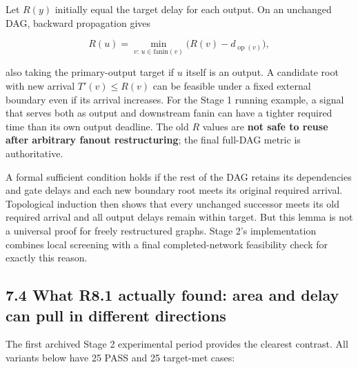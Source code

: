 Let \(R(y)\) initially equal the target delay for each output. On an unchanged DAG, backward propagation gives

\[
R(u)=\min_{v:\,u\in\mathrm{fanin}(v)}\bigl(R(v)-d_{\operatorname{op}(v)}\bigr),
\]

also taking the primary-output target if \(u\) itself is an output. A candidate root with new arrival \(T'(v)\le R(v)\) can be feasible under a fixed external boundary even if its arrival increases. For the Stage 1 running example, a signal that serves both as output and downstream fanin can have a tighter required time than its own output deadline. The old \(R\) values are \textbf{not safe to reuse after arbitrary fanout restructuring}; the final full-DAG metric is authoritative.

A formal sufficient condition holds if the rest of the DAG retains its dependencies and gate delays and each new boundary root meets its original required arrival. Topological induction then shows that every unchanged successor meets its old required arrival and all output delays remain within target. But this lemma is not a universal proof for freely restructured graphs. Stage 2's implementation combines local screening with a final completed-network feasibility check for exactly this reason.

\subsection{7.4 What R8.1 actually found: area and delay can pull in different directions}\label{what-r8.1-actually-found-area-and-delay-can-pull-in-different-directions}

The first archived Stage 2 experimental period provides the clearest contrast. All variants below have 25 PASS and 25 target-met cases:

